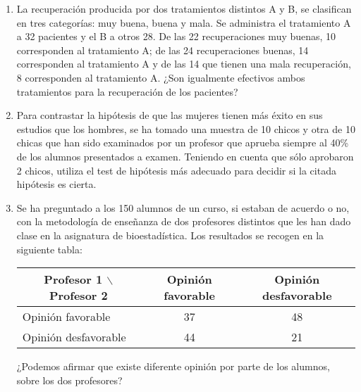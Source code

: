 \begin{enumerate}[leftmargin=*]
\item La recuperación producida por dos tratamientos distintos A y B, se clasifican en tres categorías: muy buena, buena y mala. Se
administra el tratamiento A a 32 pacientes y el B a otros 28. De las 22 recuperaciones muy buenas, 10 corresponden al tratamiento A; de las
24 recuperaciones buenas, 14 corresponden al tratamiento A y de las 14 que tienen una mala recuperación, 8 corresponden al tratamiento A.
¿Son igualmente efectivos ambos tratamientos para la recuperación de los pacientes?

\item Para contrastar la hipótesis de que las mujeres tienen más éxito en sus estudios que los hombres, se ha tomado una muestra de 10
chicos y otra de 10 chicas que han sido examinados por un profesor que aprueba siempre al 40\% de los alumnos presentados a examen. Teniendo
en cuenta que sólo aprobaron 2 chicos, utiliza el test de hipótesis más adecuado para decidir si la citada hipótesis es cierta.

\item Se ha preguntado a los 150 alumnos de un curso, si estaban de acuerdo o no, con la metodología de enseñanza de dos profesores
distintos que les han dado clase en la asignatura de bioestadística. Los resultados se recogen en la siguiente tabla:
\begin{center}
\begin{tabular}{|l|c|c|}
\cline{2-3}
\multicolumn{1}{c|}{Profesor 1 $\backslash$ Profesor 2} & Opinión favorable & Opinión desfavorable  \\
\hline
Opinión favorable & 37 & 48  \\
\hline
Opinión desfavorable & 44 & 21 \\
\hline
\end{tabular}
\end{center}

¿Podemos afirmar que existe diferente opinión por parte de los alumnos, sobre los dos profesores?

\end{enumerate}

